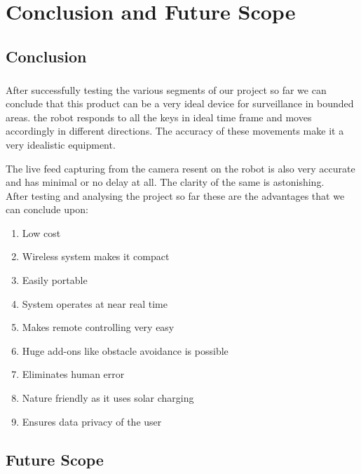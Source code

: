 \chapter{Conclusion and Future Scope}
\section{Conclusion}
\paragraph{}After successfully testing the various segments of our project so far we can conclude that this product can be a very ideal device for surveillance in bounded areas. the robot responds to all the keys in ideal time frame and moves accordingly in different directions. The accuracy of these movements make it a very idealistic equipment.

The live feed capturing from the camera resent on the robot is also very accurate and has minimal or no delay at all. The clarity of the same is astonishing.\\
\newline
After testing and analysing the project so far these are the advantages that we can conclude upon:
\begin{enumerate}
\item Low cost
\item Wireless system makes it compact
\item Easily portable
\item System operates at near real time
\item Makes remote controlling very easy
\item Huge add-ons like obstacle avoidance is possible
\item Eliminates human error
\item Nature friendly as it uses solar charging
\item Ensures data privacy of the user
\end{enumerate}

\section{Future Scope}
